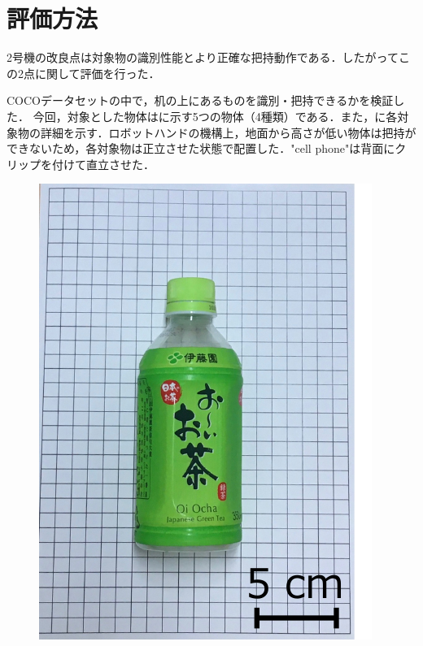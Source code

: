 \section{評価方法}
2号機の改良点は対象物の識別性能とより正確な把持動作である．したがってこの2点に関して評価を行った．

COCOデータセットの中で，机の上にあるものを識別・把持できるかを検証した．
今回，対象とした物体はに示す5つの物体（4種類）である．また，に各対象物の詳細を示す．ロボットハンドの機構上，地面から高さが低い物体は把持ができないため，各対象物は正立させた状態で配置した．"cell phone"は背面にクリップを付けて直立させた．
\begin{figure}[H]
    \centering
    
    \begin{minipage}{0.19\columnwidth}
        \centering
        \includegraphics[clip, width=\linewidth]{figure/chapter4/bottle_350ml}

\end{minipage}
\end{figure}
